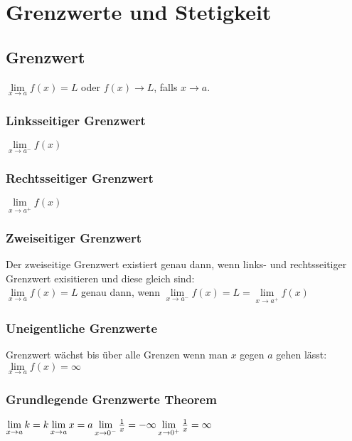 \documentclass[../main.tex]{subfiles}
\begin{document}

\chapter{Grenzwerte und Stetigkeit}
\section{Grenzwert}
$\lim\limits_{x\to a}f(x)=L$ oder $f(x)\to L$, falls $x\to a$.

\subsection{Linksseitiger Grenzwert}
$\lim\limits_{x\to a^-}f(x)$

\subsection{Rechtsseitiger Grenzwert}
$\lim\limits_{x\to a^+}f(x)$

\subsection{Zweiseitiger Grenzwert}
Der zweiseitige Grenzwert existiert genau dann, wenn links- und rechtsseitiger Grenzwert exisitieren und diese gleich sind: \\ [7pt]
$\lim\limits_{x\to a}f(x)=L$ genau dann, wenn $\lim\limits_{x\to a^-}f(x)=L=\lim\limits_{x\to a^+}f(x)$

\subsection{Uneigentliche Grenzwerte}
Grenzwert wächst bis über alle Grenzen wenn man $x$ gegen $a$ gehen lässt: \\ [7pt]
$\lim\limits_{x\to a}f(x)=\infty$

\subsection{Grundlegende Grenzwerte Theorem}
\begin{math}
    \lim\limits_{x\to a} k = k \\ [7pt]
    \lim\limits_{x\to a} x = a \\ [7pt]
    \lim\limits_{x\to 0^-} \frac{1}{x} = -\infty \\ [7pt]
    \lim\limits_{x\to 0^+} \frac{1}{x} = \infty
\end{math}
\end{document}
